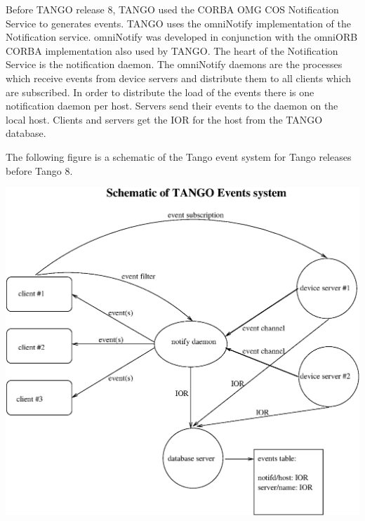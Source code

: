 Before TANGO release 8, TANGO used the CORBA OMG COS Notification
Service to generates events. TANGO uses
the omniNotify implementation of the Notification
service. omniNotify was developed in conjunction with the omniORB
CORBA implementation also used by TANGO. The heart of the Notification
Service is the notification daemon. The omniNotify daemons are the
processes which receive events from device servers and distribute
them to all clients which are subscribed. In order to distribute the
load of the events there is one notification daemon per host. Servers
send their events to the daemon on the local host. Clients and servers
get the IOR for the host from the TANGO database. 

The following figure is a schematic of the Tango event system for
Tango releases before Tango 8.

\vspace{0.3cm}


\begin{center}
\includegraphics[bb=0bp 0bp 523bp 485bp,clip,scale=0.8]{ds_model/event_schematic}
\par\end{center}

\vspace{0.3cm}


